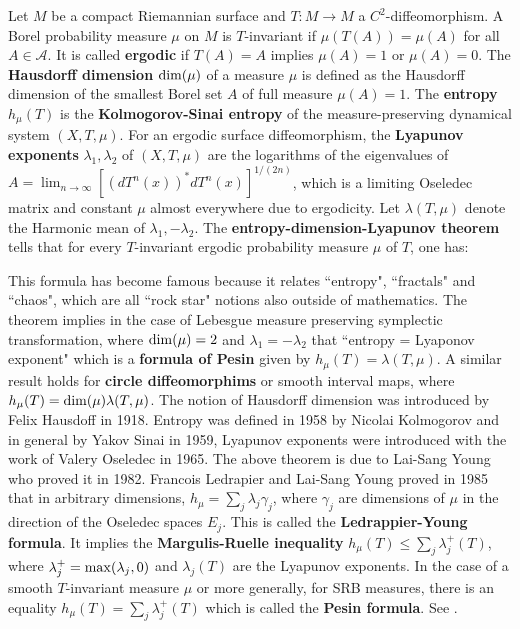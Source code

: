 \documentclass[12pt]{amsart}
\def\satz#1{ \vspace{2mm} \begin{center} \fcolorbox{yellow1}{yellow1}{ \parbox{14.0cm}{{\bf Theorem:} #1}} \vspace{2mm} \end{center} }
\begin{document}
Let $M$ be a compact Riemannian surface and $T: M \to M$ a $C^2$-diffeomorphism. A Borel
probability measure $\mu$ on $M$ is $T$-invariant if $\mu(T(A))=\mu(A)$ for all
$A \in \mathcal{A}$. It is called {\bf ergodic} if $T(A)=A$ implies $\mu(A)=1$ or
$\mu(A)=0$. The {\bf Hausdorff dimension} ${\rm dim}(\mu)$ of a measure $\mu$ is
defined as the Hausdorff dimension of the smallest Borel set $A$ of full measure
$\mu(A)=1$. The {\bf entropy} $h_{\mu}(T)$ is the {\bf Kolmogorov-Sinai entropy}
of the measure-preserving dynamical system $(X,T,\mu)$. 
For an ergodic surface diffeomorphism, the 
{\bf Lyapunov exponents} $\lambda_1,\lambda_2$ of $(X,T,\mu)$ are the
logarithms of the eigenvalues of $A=\lim_{n \to \infty} [(dT^n(x))^* dT^n(x)]^{1/(2n)}$,
which is a limiting Oseledec matrix and constant $\mu$ almost everywhere due to ergodicity.
Let $\lambda(T,\mu)$ denote the Harmonic mean of $\lambda_1,-\lambda_2$. 
The {\bf entropy-dimension-Lyapunov theorem} tells that for every $T$-invariant ergodic
probability measure $\mu$ of $T$, one has:

\satz{$h_{\mu} = {\rm dim}(\mu) \lambda/2$.} 

This formula has become famous because it relates ``entropy", ``fractals" and ``chaos", which
are all ``rock star" notions also outside of mathematics. The theorem
implies in the case of Lebesgue measure preserving 
symplectic transformation, where ${\rm dim}(\mu)=2$ and $\lambda_1=-\lambda_2$ that
``entropy = Lyaponov exponent" which is a {\bf formula of Pesin} given by 
$h_{\mu}(T) = \lambda(T,\mu)$. A similar result holds for {\bf circle     
diffeomorphims} or smooth interval maps, where $h_{\mu}(T) = {\rm dim}(\mu) \lambda(T,\mu)$.
The notion of Hausdorff dimension was introduced by Felix Hausdoff in 1918. Entropy 
was defined in 1958 by Nicolai Kolmogorov and in general by Yakov Sinai in 1959, 
Lyapunov exponents were introduced with the work of Valery Oseledec in 1965.  
The above theorem is due to Lai-Sang Young who proved it in 1982. 
Francois Ledrapier and Lai-Sang Young proved in 1985 that in arbitrary dimensions,      
$h_{\mu} = \sum_j \lambda_j \gamma_j$, where $\gamma_j$ are dimensions of    
$\mu$ in the direction of the Oseledec spaces $E_j$. This is called the 
{\bf Ledrappier-Young formula}. It implies the {\bf Margulis-Ruelle inequality}
$h_{\mu}(T)  \leq \sum_j \lambda_j^+(T)$, where $\lambda_j^+={\rm max}(\lambda_j,0)$
and $\lambda_j(T)$ are the Lyapunov exponents.
In the case of a smooth $T$-invariant measure $\mu$ or more generally, for SRB measures,
there is an equality
$h_{\mu}(T)  = \sum_j \lambda_j^+(T)$ which is called the {\bf Pesin formula}.  
See \cite{KH,RuelleEckmann}.
\end{document}

